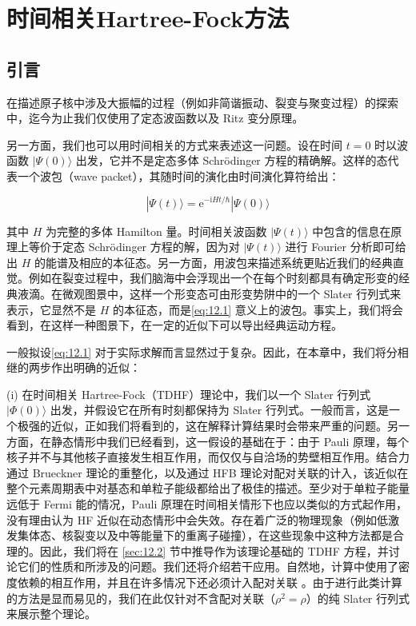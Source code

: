 
\chapter{时间相关Hartree-Fock方法\label{chap:tdhf}}

\section{引言\label{sec:12.1}}

在描述原子核中涉及大振幅的过程（例如非简谐振动、裂变与聚变过程）的探索中，迄今为止我们仅使用了定态波函数以及 Ritz 变分原理。

另一方面，我们也可以用时间相关的方式来表述这一问题。设在时间 $t=0$ 时以波函数 $|\Psi(0)\rangle$ 出发，它并不是定态多体
Schrödinger 方程的精确解。这样的态代表一个波包（wave packet），其随时间的演化由时间演化算符给出：

\begin{equation}
|\Psi(t)\rangle=\mathrm{e}^{-\mathrm{i}Ht/\hbar}|\Psi(0)\rangle\label{eq:12.1}
\end{equation}

其中 $H$ 为完整的多体 Hamilton 量。时间相关波函数 $|\Psi(t)\rangle$ 中包含的信息在原理上等价于定态
Schrödinger 方程的解，因为对 $|\Psi(t)\rangle$ 进行 Fourier 分析即可给出 $H$ 的能谱及相应的本征态。另一方面，用波包来描述系统更贴近我们的经典直觉。例如在裂变过程中，我们脑海中会浮现出一个在每个时刻都具有确定形变的经典液滴。在微观图景中，这样一个形变态可由形变势阱中的一个
Slater 行列式来表示，它显然不是 $H$ 的本征态，而是\ref{eq:12.1} 意义上的波包。事实上，我们将会看到，在这样一种图景下，在一定的近似下可以导出经典运动方程。

一般拟设\ref{eq:12.1} 对于实际求解而言显然过于复杂。因此，在本章中，我们将分相继的两步作出明确的近似：

(i) 在时间相关 Hartree-Fock（TDHF）理论中，我们以一个 Slater 行列式 $|\Phi(0)\rangle$
出发，并假设它在所有时刻都保持为 Slater 行列式。一般而言，这是一个极强的近似，正如我们将看到的，这在解释计算结果时会带来严重的问题。另一方面，在静态情形中我们已经看到，这一假设的基础在于：由于
Pauli 原理，每个核子并不与其他核子直接发生相互作用，而仅仅与自洽场的势壁相互作用。结合力通过 Brueckner 理论的重整化，以及通过
HFB 理论对配对关联的计入，该近似在整个元素周期表中对基态和单粒子能级都给出了极佳的描述。至少对于单粒子能量远低于 Fermi 能的情况，Pauli
原理在时间相关情形下也应以类似的方式起作用，没有理由认为 HF 近似在动态情形中会失效。存在着广泛的物理现象（例如低激发集体态、核裂变以及中等能量下的重离子碰撞），在这些现象中这种方法都是合理的。因此，我们将在
\ref{sec:12.2} 节中推导作为该理论基础的 TDHF 方程，并讨论它们的性质和所涉及的问题。我们还将介绍若干应用。自然地，计算中使用了密度依赖的相互作用，并且在许多情况下还必须计入配对关联
\cite{Be66,BF76}。由于进行此类计算的方法是显而易见的，我们在此仅针对不含配对关联（$\rho^{2}=\rho$）的纯
Slater 行列式来展示整个理论。

